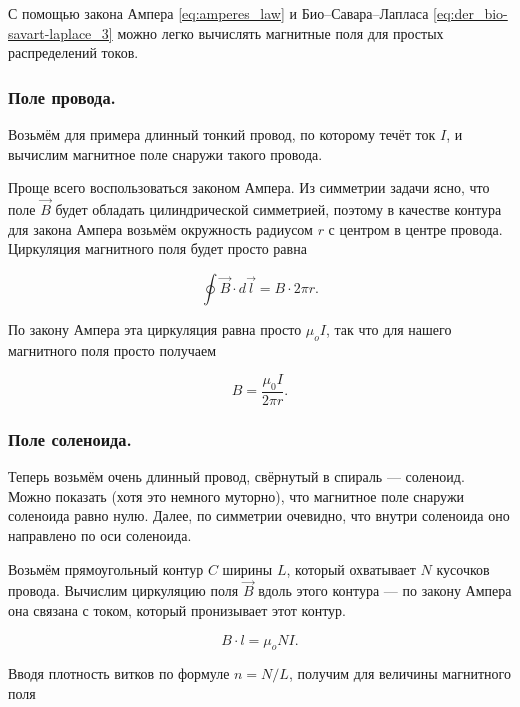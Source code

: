 \documentclass[12pt,a4paper]{article}
\numberwithin{equation}{section}
\numberwithin{equation}{section}
\begin{document}
С помощью закона Ампера \eqref{eq:amperes_law} и Био--Савара--Лапласа
\eqref{eq:der_bio-savart-laplace_3} можно легко вычислять магнитные
поля для простых распределений токов. 

\subsubsection{Поле провода. }
\label{sec:mfield_wire}

Возьмём для примера длинный тонкий провод, по которому течёт ток $I$,
и вычислим магнитное поле снаружи такого провода.

Проще всего воспользоваться законом Ампера. Из симметрии задачи ясно,
что поле $\vec{B}$ будет обладать цилиндрической симметрией, поэтому в
качестве контура для закона Ампера возьмём окружность радиусом $r$ с
центром в центре провода. Циркуляция магнитного поля будет просто
равна

\begin{equation}
  \label{eq:mfield_thin_current_1}
  \oint \vec{B} \cdot d \vec{l} = B \cdot 2 \pi r.
\end{equation}

По закону Ампера эта циркуляция равна просто $\mu_o I$, так что для
нашего магнитного поля просто получаем

\begin{equation}
  \label{eq:mfield_thin_current_2}
  B =  \frac{\mu_0 I}{2\pi r}.
\end{equation}

\subsubsection{Поле соленоида.}
\label{sec:mfield_solenoid}

Теперь возьмём очень длинный провод, свёрнутый в спираль ---
соленоид. Можно показать (хотя это немного муторно), что магнитное
поле снаружи соленоида равно нулю. Далее, по симметрии очевидно, что
внутри соленоида оно направлено по оси соленоида. 

Возьмём прямоугольный контур $C$ ширины $L$, который охватывает $N$
кусочков провода. Вычислим циркуляцию поля $\vec{B}$ вдоль этого
контура --- по закону Ампера она связана с током, который пронизывает
этот контур. 

\begin{equation}
  \label{eq:der_mfield_solenoid}
  B \cdot l = \mu_o N I.
\end{equation}

Вводя плотность витков по формуле $n = N/L$, получим для величины
магнитного поля
\end{document}
